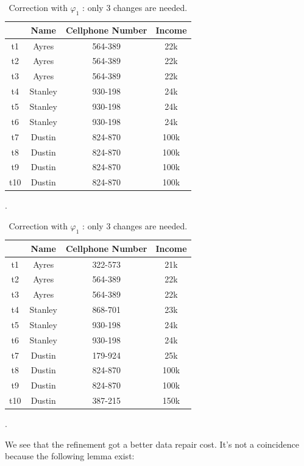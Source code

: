 \documentclass[letterpaper, 12pt]{report}
\begin{document}
\begin{table}[H]
	\parbox{.45\linewidth}{
	\centering
	\begin{tabular}{|c|c c c|}
	\hline
	    & Name & Cellphone Number & Income\\
	\hline
	 t1 & Ayres & \color{red}564-389 & \color{red}22k\\
	 t2 & Ayres & \color{red}564-389 & 22k\\
	 t3 & Ayres & 564-389 & 22k\\
	 t4 & Stanley &\color{red} 930-198 &\color{red}24k\\
	 t5 & Stanley &\color{red} 930-198 & 24k\\
	 t6 & Stanley & 930-198 & 24k\\
	 t7 & Dustin & \color{red}824-870 & \color{red}100k\\
	 t8 & Dustin & \color{red}824-870 & 100k\\
	 t9 & Dustin & 824-870 & 100k\\
	 t10 & Dustin & \color{red}824-870 & \color{red}100k\\
	 \hline
	\end{tabular}
	\caption{Correction with $\varphi_2$: 7 changes needed only for the collumn CP.}.
	}
	\hfill
	\parbox{.45\linewidth}{
	\centering
	\begin{tabular}{|c|c c c|}
	\hline
	    & Name & Cellphone Number & Income\\
	\hline
	 t1 & Ayres & 322-573 & 21k\\
	 t2 & Ayres & \color{red} 564-389 & 22k\\
	 t3 & Ayres & 564-389 & 22k\\
	 t4 & Stanley & 868-701 &23k\\
	 t5 & Stanley & \color{red} 930-198 & 24k\\
	 t6 & Stanley & 930-198 & 24k\\
	 t7 & Dustin & 179-924 & 25k\\
	 t8 & Dustin & \color{red} 824-870 & 100k\\
	 t9 & Dustin & 824-870 & 100k\\
	 t10 & Dustin & 387-215 & 150k\\
	 \hline
	\end{tabular}
	\caption{Correction with $\varphi_1$ : only 3 changes are needed.}.
	}
\end{table}



We see that the refinement got a better data repair cost. It's not a coincidence because the following lemma exist: \cite{main}
\end{document}
